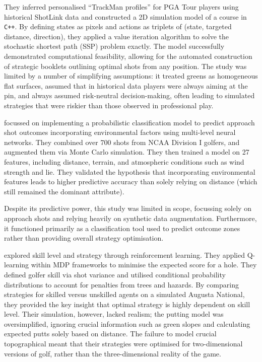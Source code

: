 \documentclass[11pt, letterpaper]{article}
\begin{document}
They inferred personalised ``TrackMan profiles'' for PGA Tour players using historical ShotLink data and constructed a 2D simulation model of a course in \texttt{C++}. By defining states as pixels and actions as triplets of (state, targeted distance, direction), they applied a value iteration algorithm to solve the stochastic shortest path (SSP) problem exactly. The model successfully demonstrated computational feasibility, allowing for the automated construction of strategic booklets outlining optimal shots from any position. The study was limited by a number of simplifying assumptions: it treated greens as homogeneous flat surfaces, assumed that in historical data players were always aiming at the pin, and always assumed risk-neutral decision-making, often leading to simulated strategies that were riskier than those observed in professional play.

\cite{khazaeli_golf_2024} focussed on implementing a probabilistic classification model to predict approach shot outcomes incorporating environmental factors using multi-level neural networks. They combined over 700 shots from NCAA Division I golfers, and augmented them via Monte Carlo simulation. They then trained a model on 27 features, including distance, terrain, and atmospheric conditions such as wind strength and lie. They validated the hypothesis that incorporating environmental features leads to higher predictive accuracy than solely relying on distance (which still remained the dominant attribute). 

Despite its predictive power, this study was limited in scope, focussing solely on approach shots and relying heavily on synthetic data augmentation. Furthermore, it functioned primarily as a classification tool used to predict outcome zones rather than providing overall strategy optimisation.

\cite{sugawara_skill-based_2013} explored skill level and strategy through reinforcement learning. They applied Q-learning within MDP frameworks to minimise the expected score for a hole. They defined golfer skill via shot variance and utilised conditional probability distributions to account for penalties from trees and hazards. By comparing strategies for skilled versus unskilled agents on a simulated Augusta National, they provided the key insight that optimal strategy is highly dependent on skill level. Their simulation, however, lacked realism; the putting model was oversimplified, ignoring crucial information such as green slopes and calculating expected putts solely based on distance. The failure to model crucial topographical meant that their strategies were optimised for two-dimensional versions of golf, rather than the three-dimensional reality of the game.
\end{document}
